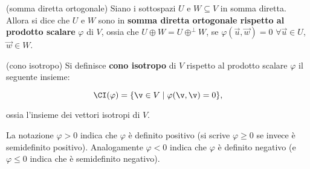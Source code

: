 \begin{definition} (somma diretta ortogonale)
	Siano i sottospazi $U$ e $W \subseteq V$ in somma diretta. Allora si dice che $U$ e $W$ sono in \textbf{somma
		diretta ortogonale rispetto al prodotto scalare} $\varphi$ di $V$, ossia che $U \oplus W = U \oplus^\perp W$, se $\varphi(\vec u, \vec w) = 0$ $\forall \vec u \in U$, $\vec w \in W$.
\end{definition}

\begin{definition} (cono isotropo)
	Si definisce \textbf{cono isotropo} di $V$ rispetto al prodotto scalare $\varphi$ il seguente insieme:
	
	\[ \CI(\varphi) = \{ \v \in V \mid \varphi(\v, \v) = 0 \}, \]
	
	\vskip 0.05in
	
	ossia l'insieme dei vettori isotropi di $V$.
\end{definition}

\begin{note}
	La notazione $\varphi > 0$ indica che $\varphi$ è definito positivo (si scrive $\varphi \geq 0$ se invece è semidefinito
	positivo).
	Analogamente $\varphi < 0$ indica che $\varphi$ è definito negativo (e $\varphi \leq 0$ indica che è semidefinito negativo).
\end{note}

